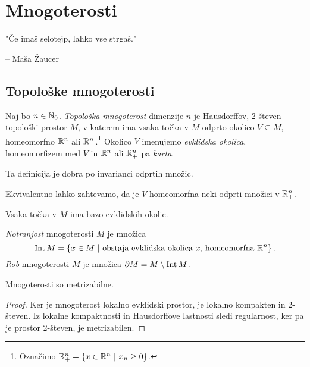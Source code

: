 \section{Mnogoterosti}

\epigraph{"Če imaš selotejp, lahko vse strgaš."}
{-- Maša Žaucer}

\subsection{Topološke mnogoterosti}


\begin{definicija}
Naj bo $n \in \mathbb{N}_0$.
\emph{Topološka mnogoterost} dimenzije $n$ je
Hausdorffov, 2-števen topološki prostor $M$, v katerem ima vsaka
točka v $M$ odprto okolico $V \subseteq M$, homeomorfno $\mathbb{R}^n$ ali
$\mathbb{R}_+^n$.\footnote{Označimo
$\mathbb{R}_+^n = \left\{x \in \mathbb{R}^n~\middle\vert~x_n \geq 0\right\}$.} Okolico $V$ imenujemo
\emph{evklidska okolica}, homeomorfizem med $V$ in $\mathbb{R}^n$ ali
$\mathbb{R}_+^n$ pa \emph{karta}.
\end{definicija}

\begin{opomba}
Ta definicija je dobra po invarianci odprtih množic.
\end{opomba}

\begin{opomba}
Ekvivalentno lahko zahtevamo, da je $V$ homeomorfna neki odprti
množici v $\mathbb{R}_+^n$.
\end{opomba}

\begin{opomba}
Vsaka točka v $M$ ima bazo evklidskih okolic.
\end{opomba}

\begin{definicija}
\emph{Notranjost} mnogoterosti
$M$ je množica
\[
\operatorname{Int} M = \left\{x \in M~\middle\vert~\text{obstaja evklidska okolica $x$, homeomorfna $\mathbb{R}^n$}\right\}.
\]
\emph{Rob} mnogoterosti $M$ je množica
$\partial M = M \setminus \operatorname{Int} M$.
\end{definicija}

\begin{trditev}
Mnogoterosti so metrizabilne.
\end{trditev}

\begin{proof}
Ker je mnogoterost lokalno evklidski prostor, je lokalno kompakten
in 2-števen. Iz lokalne kompaktnosti in Hausdorffove lastnosti
sledi regularnost, ker pa je prostor 2-števen, je metrizabilen.
\end{proof}

